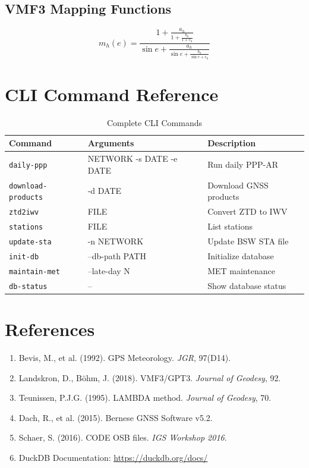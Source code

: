 \documentclass[11pt,a4paper,twoside]{report}
\newcommand{\code}[1]{\texttt{\small\color{primaryblue}#1}}
\begin{document}
\section{VMF3 Mapping Functions}

\begin{equation}
m_h(e) = \frac{1 + \frac{a_h}{1 + \frac{b_h}{1 + c_h}}}{\sin e + \frac{a_h}{\sin e + \frac{b_h}{\sin e + c_h}}}
\end{equation}

\appendix

\chapter{CLI Command Reference}

\begin{table}[H]
\centering
\caption{Complete CLI Commands}
\label{tab:cli-commands}
\small
\begin{tabular}{@{}llp{5cm}@{}}
\toprule
\textbf{Command} & \textbf{Arguments} & \textbf{Description} \\
\midrule
\code{daily-ppp} & NETWORK -s DATE -e DATE & Run daily PPP-AR \\
\code{download-products} & -d DATE & Download GNSS products \\
\code{ztd2iwv} & FILE & Convert ZTD to IWV \\
\code{stations} & FILE & List stations \\
\code{update-sta} & -n NETWORK & Update BSW STA file \\
\code{init-db} & --db-path PATH & Initialize database \\
\code{maintain-met} & --late-day N & MET maintenance \\
\code{db-status} & -- & Show database status \\
\bottomrule
\end{tabular}
\end{table}

\chapter{References}

\begin{enumerate}
    \item Bevis, M., et al. (1992). GPS Meteorology. \textit{JGR}, 97(D14).
    \item Landskron, D., B\"ohm, J. (2018). VMF3/GPT3. \textit{Journal of Geodesy}, 92.
    \item Teunissen, P.J.G. (1995). LAMBDA method. \textit{Journal of Geodesy}, 70.
    \item Dach, R., et al. (2015). Bernese GNSS Software v5.2.
    \item Schaer, S. (2016). CODE OSB files. \textit{IGS Workshop 2016}.
    \item DuckDB Documentation: \url{https://duckdb.org/docs/}
\end{enumerate}
\end{document}
